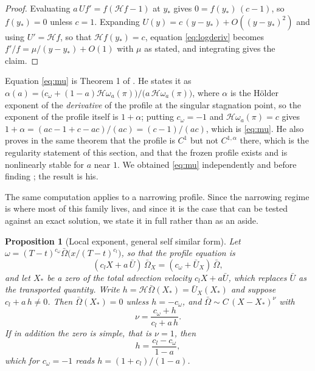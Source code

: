 \documentclass[11pt]{article}
\newtheorem{proposition}{Proposition}
\theoremstyle{definition}
\newcommand{\Hil}{\mathcal{H}}
\newcommand{\Ub}{\bar{U}}
\newcommand{\Ob}{\bar{\Omega}}
\begin{document}
\begin{proof}
Evaluating $a\,Uf' = f(\Hil f - 1)$ at $y_\ast$ gives
$0 = f(y_\ast)\,(c-1)$, so $f(y_\ast)=0$ unless $c=1$. Expanding
$U(y) = c\,(y-y_\ast) + O((y-y_\ast)^2)$ and using $U'=\Hil f$, so that
$\Hil f(y_\ast) = c$, equation \eqref{eq:logderiv} becomes
$f'/f = \mu/(y-y_\ast) + O(1)$ with $\mu$ as stated, and integrating gives the
claim.
\end{proof}

Equation \eqref{eq:mu} is Theorem 1 of \cite{chenS1}. He states it as
$\alpha(a) = \bigl(c_\omega + (1-a)\Hil\omega_a(\pi)\bigr)/\bigl(a\,
\Hil\omega_a(\pi)\bigr)$, where $\alpha$ is the H\"{o}lder exponent of the
\emph{derivative} of the profile at the singular stagnation point, so the
exponent of the profile itself is $1+\alpha$; putting $c_\omega=-1$ and
$\Hil\omega_a(\pi)=c$ gives
$1+\alpha = (ac - 1 + c - ac)/(ac) = (c-1)/(ac)$, which is \eqref{eq:mu}. He
also proves in the same theorem that the profile is $C^1$ but not
$C^{1,\alpha}$ there, which is the regularity statement of this section, and
that the frozen profile exists and is nonlinearly stable for $a$ near $1$. We
obtained \eqref{eq:mu} independently and before finding \cite{chenS1}; the
result is his.

The same computation applies to a narrowing profile. Since the narrowing regime
is where most of this family lives, and since it is the case that can be tested
against an exact solution, we state it in full rather than as an aside.

\begin{proposition}[Local exponent, general self similar form]
\label{prop:general}
Let $\omega = (T-t)^{c_\omega}\Ob\big(x/(T-t)^{c_l}\big)$, so that the profile
equation is
\begin{equation}
  (c_l X + a\,\Ub)\,\Ob_X = (c_\omega + \Ub_X)\,\Ob ,
  \label{eq:profgeneral}
\end{equation}
and let $X_\ast$ be a zero of the total advection velocity $c_l X + a\Ub$,
which replaces $\Ub$ as the transported quantity. Write
$h = \Hil\Ob(X_\ast) = \Ub_X(X_\ast)$ and suppose $c_l + a\,h \ne 0$. Then
$\Ob(X_\ast)=0$ unless $h = -c_\omega$, and $\Ob \sim C\,(X-X_\ast)^{\nu}$ with
\begin{equation}
  \nu = \frac{c_\omega + h}{c_l + a\,h}.
  \label{eq:nugeneral}
\end{equation}
If in addition the zero is simple, that is $\nu = 1$, then
\begin{equation}
  h = \frac{c_l - c_\omega}{1-a},
  \label{eq:hgeneral}
\end{equation}
which for $c_\omega = -1$ reads $h = (1+c_l)/(1-a)$.
\end{proposition}
\end{document}
